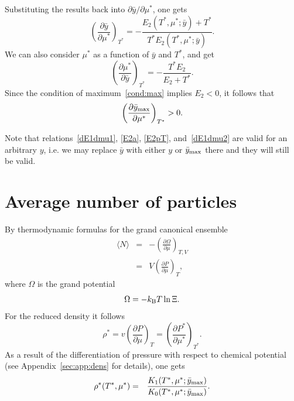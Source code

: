 \documentclass[12pt]{article}
\numberwithin{equation}{section}
\begin{document}
	Substituting the results back into $\partial \bar{y}/\partial \mu^*$, one gets
	\begin{equation}
		\label{dydm}
		\left(\frac{\partial \bar{y}}{\partial \mu^*} \right)_{T^*} = -\frac{E_2(T^*,\mu^*;\bar{y}) + T^*}{T^* E_2(T^*,\mu^*;\bar{y})}.
	\end{equation}
	We can also consider $\mu^*$ as a function of $\bar{y}$ and $T^*$, and get
	\begin{equation}
		\left(\frac{\partial \mu^*}{\partial \bar{y}} \right)_{T^*} = -\frac{T^* E_2}{E_2 + T^*}.
	\end{equation}
	Since the condition of maximum~\eqref{cond:max} implies $E_2 < 0$, it follows that
	\begin{equation}
		\left(\frac{\partial \bar{y}_{\rm max}}{\partial \mu^*} \right)_{T^*} > 0.
	\end{equation}
	
	Note that relations~\eqref{dE1dmu1}, \eqref{E2a}, \eqref{E2pT}, and~\eqref{dE1dmu2} are valid for an arbitrary $y$, i.e. we may replace $\bar{y}$ with either $y$ or $\bar{y}_{\rm max}$ there and they will still be valid.
	
	
	\pagebreak
	\section{Average number of particles}
	By thermodynamic formulas for the grand canonical ensemble
	\begin{eqnarray}
		\langle N \rangle & = & -\left(\frac{\partial \Omega}{\partial \mu}\right)_{T,V}
		\nonumber\\
		& = & V \left(\frac{\partial P}{\partial \mu}\right)_T,
	\end{eqnarray}
	where $\Omega$ is the grand potential
	\begin{equation}
		\Omega = -k_{\rm B} T \ln \Xi.
	\end{equation}
	For the reduced density it follows
	\begin{equation}
		\label{eq:dens}
		\rho^* = v\left(\frac{\partial P}{\partial \mu}\right)_T = \left(\frac{\partial P^*}{\partial \mu^*}\right)_{T^*}.
	\end{equation}
	As a result of the differentiation of pressure with respect to chemical potential (see Appendix~\ref{sec:app:dens} for details), one gets
	\begin{eqnarray}
		\label{eq:densK}
		\rho^*(T^*,\mu^*) & = & \frac{K_1(T^*,\mu^*;\bar{y}_{\rm max})}{K_0(T^*,\mu^*;\bar{y}_{\rm max})}.
	\end{eqnarray}
	
\end{document}
